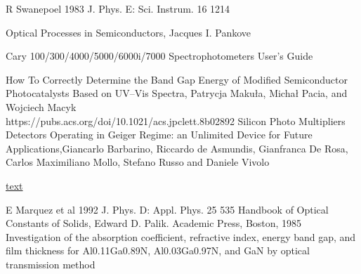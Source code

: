 \documentclass[10pt,a4paper]{article}
\begin{document}
\begin{multicols}{2}
\begin{thebibliography}{9}
R Swanepoel 1983 J. Phys. E: Sci. Instrum. 16 1214

Optical Processes in Semiconductors, Jacques I. Pankove

Cary 100/300/4000/5000/6000i/7000 Spectrophotometers User's Guide

How To Correctly Determine the Band Gap Energy of Modified Semiconductor Photocatalysts Based on UV–Vis Spectra, Patrycja Makuła, Michał Pacia, and Wojciech Macyk\\https://pubs.acs.org/doi/10.1021/acs.jpclett.8b02892
Silicon Photo Multipliers Detectors Operating in Geiger Regime: an Unlimited Device for Future Applications,Giancarlo Barbarino, Riccardo de Asmundis, Gianfranca De Rosa, Carlos Maximiliano Mollo, Stefano Russo and Daniele Vivolo


 \href{https://erdogant.github.io/findpeaks/pages/html/Examples.html#find-peaks-in-low-sampled-dataset}{text}


 E Marquez et al 1992 J. Phys. D: Appl. Phys. 25 535
Handbook of Optical Constants of Solids, Edward D. Palik. Academic Press, Boston, 1985 
Investigation of the absorption coefficient, refractive index, energy band gap, and film thickness for Al0.11Ga0.89N, Al0.03Ga0.97N, and GaN by optical transmission method
\end{thebibliography}


\end{multicols}
\end{document}
